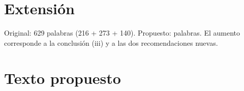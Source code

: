 \section{Extensión}

Original: 629 palabras (216 + 273 + 140). Propuesto: palabras. El aumento corresponde a la conclusión (iii) y a las dos recomendaciones nuevas.

\section{Texto propuesto}

\begin{propuesto}

\end{propuesto}





